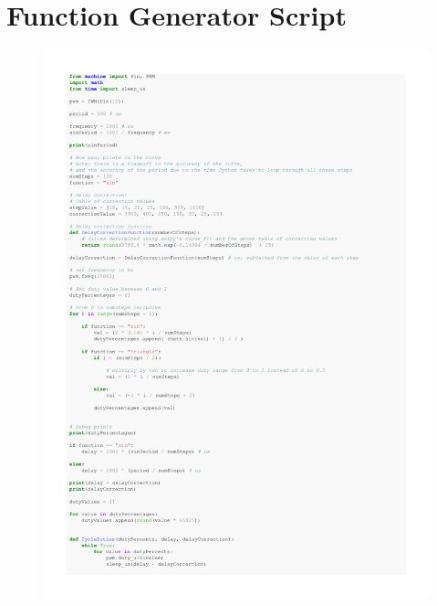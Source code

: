 \documentclass[%
 reprint,
 amsmath,amssymb,
 aps,
]{revtex4-2}
\begin{document}
\section{Function Generator Script}
    \begin{figure}[h]
        \includegraphics[width=\columnwidth,page=1]{Images/functionGenerator.pdf}
    \end{figure}
\end{document}
